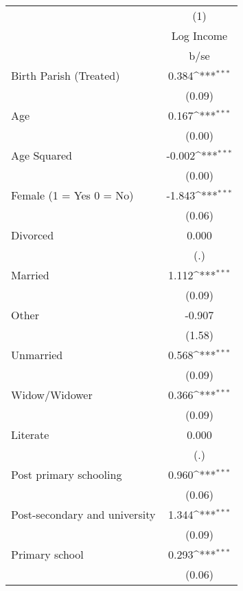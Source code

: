 {
\def\sym#1{\ifmmode^{#1}\else\(^{#1}\)\fi}
\begin{tabular}{l*{1}{c}}
\hline\hline
                    &\multicolumn{1}{c}{(1)}\\
                    &\multicolumn{1}{c}{Log Income}\\
                    &        b/se         \\
\hline
Birth Parish (Treated)&       0.384\sym{***}\\
                    &      (0.09)         \\
Age                 &       0.167\sym{***}\\
                    &      (0.00)         \\
Age Squared         &      -0.002\sym{***}\\
                    &      (0.00)         \\
Female (1 = Yes 0 = No)&      -1.843\sym{***}\\
                    &      (0.06)         \\
Divorced            &       0.000         \\
                    &         (.)         \\
Married             &       1.112\sym{***}\\
                    &      (0.09)         \\
Other               &      -0.907         \\
                    &      (1.58)         \\
Unmarried           &       0.568\sym{***}\\
                    &      (0.09)         \\
Widow/Widower       &       0.366\sym{***}\\
                    &      (0.09)         \\
Literate            &       0.000         \\
                    &         (.)         \\
Post primary schooling&       0.960\sym{***}\\
                    &      (0.06)         \\
Post-secondary and university&       1.344\sym{***}\\
                    &      (0.09)         \\
Primary school      &       0.293\sym{***}\\
                    &      (0.06)         \\

\end{tabular}}
